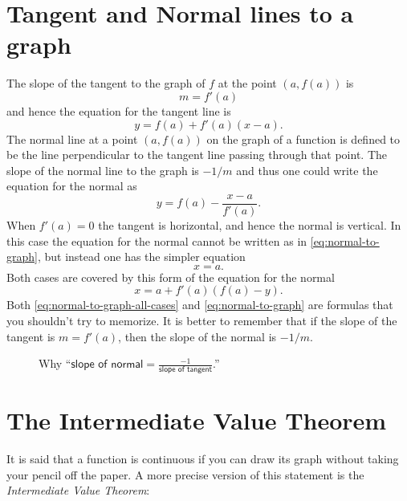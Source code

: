 \section{Tangent and Normal lines to a graph} %
The slope of the tangent to the graph of $f$ at the point $(a,
f(a))$ is
\begin{equation}
  m = f'(a)
\end{equation}
and hence the equation for the tangent line is
\begin{equation}
  \label{eq:tangent-to-graph}
  y = f(a) + f'(a) (x-a).
\end{equation}
The normal line at a point $(a,f(a))$ on the graph of a function is defined to
be the line perpendicular to the tangent line passing through that point.  The
slope of the normal line to the graph is $-1/m$ and thus one could write the
equation for the normal as
\begin{equation}
  \label{eq:normal-to-graph}
  y=f(a) - \frac{x-a}{f'(a)}.
\end{equation}
When $f'(a)=0$ the tangent is horizontal, and hence the normal is
vertical.  In this case the equation for the normal cannot be written
as in \eqref{eq:normal-to-graph}, but instead one has the simpler
equation
\[
x=a.
\]
Both cases are covered by this form of the equation for the normal
\begin{equation}
  \label{eq:normal-to-graph-all-cases}
  x=a+f'(a)(f(a)-y).
\end{equation}
Both \eqref{eq:normal-to-graph-all-cases} and \eqref{eq:normal-to-graph} are
formulas that you shouldn't try to memorize.  It is better to remember that if
the slope of the tangent is $m=f'(a)$, then the slope of the normal is $-1/m$.
\begin{figure}[h]
  \centering 
  \caption{Why ``$\displaystyle \textsf{slope of normal} =
    \frac{-1}{\textsf{slope of tangent}}$.''}
  \label{fig:05tangentAndNormal}
\end{figure}




\section{The Intermediate Value Theorem} %
It is said that a function is continuous if you can draw its graph without
taking your pencil off the paper.  A more precise version of this statement is
the \textit{Intermediate Value Theorem}:




